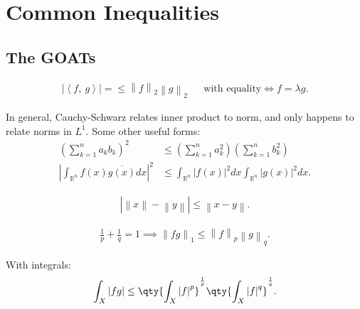 \hypertarget{common-inequalities}{%
\section{Common Inequalities}\label{common-inequalities}}

\hypertarget{the-goats}{%
\subsection{The GOATs}\label{the-goats}}

\begin{proposition}

\begin{align*}  
{\left\lvert {{\left\langle {f},~{g} \right\rangle}} \right\rvert} = \leq {\left\lVert {f} \right\rVert}_{2} {\left\lVert {g} \right\rVert}_{2}
&& \text{with equality} \iff f = \lambda g
.\end{align*}

\end{proposition}

\begin{remark}

In general, Cauchy-Schwarz relates inner product to norm, and only
happens to relate norms in \(L^1\). Some other useful forms:
\begin{align*}
\left(\sum_{k=1}^{n} a_{k} b_{k}\right)^{2} 
&\leq\left(\sum_{k=1}^{n} a_{k}^{2}\right)\left(\sum_{k=1}^{n} b_{k}^{2}\right) \\
\left|\int_{\mathbb{R}^{n}} f(x) \overline{g(x)} d x\right|^{2} 
&\leq \int_{\mathbb{R}^{n}}|f(x)|^{2} d x \int_{\mathbb{R}^{n}}|g(x)|^{2} d x
.\end{align*}

\end{remark}

\begin{proposition}

\begin{align*}  
{\left\lvert {{\left\lVert {x} \right\rVert} - {\left\lVert {y} \right\rVert}} \right\rvert} \leq {\left\lVert {x - y} \right\rVert}
.\end{align*}

\end{proposition}

\begin{proposition}

\begin{align*}  
\frac 1 p + \frac 1 q = 1 \implies {\left\lVert {f g} \right\rVert}_{1} \leq {\left\lVert {f} \right\rVert}_{p} {\left\lVert {g} \right\rVert}_{q}
.\end{align*}

With integrals:
\begin{align*}
\int_X {\left\lvert {fg} \right\rvert} \leq \qty{\int_X {\left\lvert {f} \right\rvert}^p}^{1\over p} \qty{\int_X {\left\lvert {f} \right\rvert}^q}^{1\over q}
.\end{align*}

\end{proposition}

